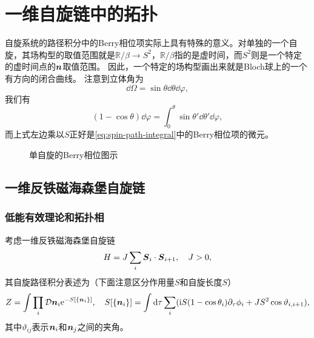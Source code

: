 \chapter{一维自旋链中的拓扑}



自旋系统的路径积分中的Berry相位项实际上具有特殊的意义。对单独的一个自旋，其场构型的取值范围就是$\mathbb{R} / \beta \rightarrow S^2$，$\mathbb{R} / \beta$指的是虚时间，而$S^2$则是一个特定的虚时间点的$\vb*{n}$取值范围。
因此，一个特定的场构型画出来就是Bloch球上的一个有方向的闭合曲线。
注意到立体角为
\[
    \dd{\Omega} = \sin \theta \dd{\theta} \dd{\varphi},
\]
我们有
\[
    (1 - \cos \theta) \dd{\varphi} = \int_0^\theta \sin \theta' \dd{\theta'} \dd{\varphi},
\]
而上式左边乘以$S$正好是\eqref{eq:spin-path-integral}中的Berry相位项的微元。

\begin{figure}
    \centering
    \subfigure[单自旋的场构型]{
        
    }
    \caption{单自旋的Berry相位图示}
\end{figure}

\section{一维反铁磁海森堡自旋链}

\subsection{低能有效理论和拓扑相}

考虑一维反铁磁海森堡自旋链
\begin{equation}
    H = J \sum_{i} \vb*{S}_i \cdot \vb*{S}_{i+1}, \quad J > 0,
\end{equation}
其自旋路径积分表述为（下面注意区分作用量$S$和自旋长度$S$）
\begin{equation}
    Z = \int \prod_i \mathcal{D} \vb*{n}_i \mathrm{e}^{-S[\{\vb*{n}_i\}]} , \quad S[\{\vb*{n}_i\}] = \int \dd{\tau} \sum_i ( \mathrm{i} S (1 - \cos \theta_i) \partial_\tau \phi_i + J S^2 \cos \vartheta_{i, i+1} ),
\end{equation}
其中$\vartheta_{ij}$表示$\vb*{n}_i$和$\vb*{n}_j$之间的夹角。

